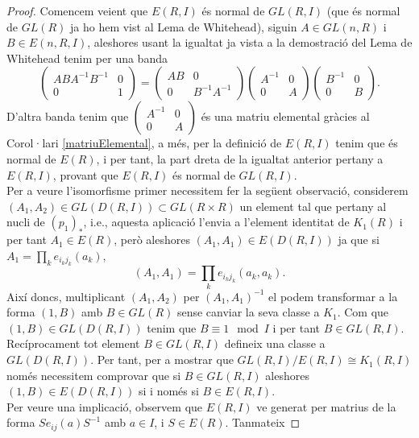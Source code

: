 \begin{proof}
Comencem veient que $E(R,I)$ és normal de $GL(R,I)$ (que és normal de $GL(R)$ ja ho hem vist al Lema de Whitehead), siguin $A\in GL(n,R)$ i $B\in E(n,R,I)$, aleshores usant la igualtat ja vista a la demostració del Lema de Whitehead tenim per una banda
$$
\left( \begin{matrix}
  ABA^{-1}B^{-1} & 0 \\
  0 & 1
 \end{matrix} \right) =  
 \left( \begin{matrix}
  AB & 0 \\
  0 & B^{-1}A^{-1}
 \end{matrix} \right)
 \left( \begin{matrix}
  A^{-1} & 0 \\
  0 & A
 \end{matrix} \right)
%
 \left( \begin{matrix}
  B^{-1} & 0 \\
  0 & B
 \end{matrix} \right). 
$$
D'altra banda tenim que  $ \left( \begin{matrix}
  A^{-1} & 0 \\
  0 & A
 \end{matrix} \right)$
 és  una matriu elemental gràcies al Corol·lari \ref{matriuElemental}, a més, per la definició de $E(R,I)$ tenim que és normal de $E(R)$, i per tant, la part dreta de la igualtat anterior pertany a $E(R,I)$, provant que $E(R,I)$ és normal de $GL(R,I)$. \\
\indent Per a veure l'isomorfisme primer necessitem fer la següent observació, considerem $(A_1,A_2)\in GL(D(R,I)) \subset GL(R\times R)$ un element tal que pertany al nucli de $(p_1)_*$, i.e., aquesta aplicació l'envia a l'element identitat de $K_1(R)$ i per tant $A_1\in E(R)$, però aleshores $(A_1,A_1)\in E(D(R,I))$ ja que si $A_1=\prod_k e_{i_kj_k}(a_k)$,
 $$
 (A_1,A_1) = \prod_k e_{i_k j_k} (a_k, a_k).
 $$
Així doncs, multiplicant $(A_1, A_2)$ per $(A_1, A_1)^{-1}$ el podem transformar a la forma $(1,B)$ amb $B\in GL(R)$ sense canviar la seva classe a $K_1$. Com que $(1,B)\in GL(D(R,I))$ tenim que $B \equiv 1 \mod I$ i per tant $B\in GL(R,I)$. Recíprocament tot element $B\in GL(R,I)$ defineix una classe a $GL(D(R,I))$. Per tant, per a mostrar que $GL(R,I)/E(R,I)\cong K_1(R,I)$ només necessitem comprovar que si $B\in GL(R,I)$ aleshores $(1,B)\in E(D(R,I))$ si i només si $B\in E(R,I)$. \\
Per veure una implicació, observem que $E(R,I)$ ve generat per matrius de la forma $Se_{ij}(a)S^{-1}$ amb $a\in I$, i $S\in E(R)$. Tanmateix

\end{proof}
